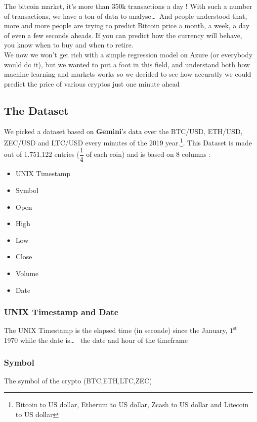 \documentclass[conference]{IEEEtran}
\begin{document}
The bitcoin market, it's more than 350k transactions a day ! With such a number of transactions, we have a ton of data to analyse\dots{}~And people understood that, more and more people are trying to predict Bitcoin price a month, a week, a day of even a few seconds aheads. If you can predict how the currency will behave, you know when to buy and when to retire.\\

We now we won't get rich with a simple regression model on Azure (or everybody would do it), but we wanted to put a foot in this field, and understand both how machine learning and markets works so we decided to see how accuratly we could predict the price of various cryptos just one minute ahead

\subsection{The Dataset}

We picked a dataset based on \textbf{Gemini}'s data over the BTC/USD, ETH/USD, ZEC/USD and LTC/USD every minutes of the 2019 year.\footnote{Bitcoin to US dollar, Etherum to US dollar, Zcash to US dollar and Litecoin to US dollar}. This Dataset is made out of 1.751.122 entries ($\dfrac{1}{4}$ of each coin) and is based on 8 columns : 
\begin{multicols}{2}
\begin{itemize}
\item UNIX Timestamp
\item Symbol
\item Open
\item High
\item Low
\item Close
\item Volume
\item Date
\end{itemize}
\end{multicols}

\subsubsection*{UNIX Timestamp and Date} The UNIX Timestamp is the elapsed time (in seconde) since the January, $1^{\textrm{st}}$ 1970 while the date is\dots~ the date and hour of the timeframe\\

\subsubsection*{Symbol} The symbol of the crypto (BTC,ETH,LTC,ZEC)\\
\end{document}
